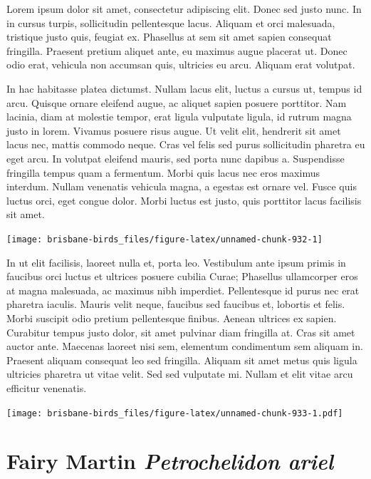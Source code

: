 \documentclass[]{book}
\let\origfigure\figure
\let\endorigfigure\endfigure
\renewenvironment{figure}[1][2] {
  \expandafter\origfigure\expandafter[H]
} {
  \endorigfigure
}
\begin{document}
Lorem ipsum dolor sit amet, consectetur adipiscing elit. Donec sed justo
nunc. In in cursus turpis, sollicitudin pellentesque lacus. Aliquam et
orci malesuada, tristique justo quis, feugiat ex. Phasellus at sem sit
amet sapien consequat fringilla. Praesent pretium aliquet ante, eu
maximus augue placerat ut. Donec odio erat, vehicula non accumsan quis,
ultricies eu arcu. Aliquam erat volutpat.

In hac habitasse platea dictumst. Nullam lacus elit, luctus a cursus ut,
tempus id arcu. Quisque ornare eleifend augue, ac aliquet sapien posuere
porttitor. Nam lacinia, diam at molestie tempor, erat ligula vulputate
ligula, id rutrum magna justo in lorem. Vivamus posuere risus augue. Ut
velit elit, hendrerit sit amet lacus nec, mattis commodo neque. Cras vel
felis sed purus sollicitudin pharetra eu eget arcu. In volutpat eleifend
mauris, sed porta nunc dapibus a. Suspendisse fringilla tempus quam a
fermentum. Morbi quis lacus nec eros maximus interdum. Nullam venenatis
vehicula magna, a egestas est ornare vel. Fusce quis luctus orci, eget
congue dolor. Morbi luctus est justo, quis porttitor lacus facilisis sit
amet.

\begin{figure}
\texttt{[image: brisbane-birds\_files/figure-latex/unnamed-chunk-932-1]} \caption{insert figure caption}\label{fig:unnamed-chunk-932}
\end{figure}

In ut elit facilisis, laoreet nulla et, porta leo. Vestibulum ante ipsum
primis in faucibus orci luctus et ultrices posuere cubilia Curae;
Phasellus ullamcorper eros at magna malesuada, ac maximus nibh
imperdiet. Pellentesque id purus nec erat pharetra iaculis. Mauris velit
neque, faucibus sed faucibus et, lobortis et felis. Morbi suscipit odio
pretium pellentesque finibus. Aenean ultrices ex sapien. Curabitur
tempus justo dolor, sit amet pulvinar diam fringilla at. Cras sit amet
auctor ante. Maecenas laoreet nisi sem, elementum condimentum sem
aliquam in. Praesent aliquam consequat leo sed fringilla. Aliquam sit
amet metus quis ligula ultricies pharetra ut vitae velit. Sed sed
vulputate mi. Nullam et elit vitae arcu efficitur venenatis.

\begin{figure}
\centering
\texttt{[image: brisbane-birds\_files/figure-latex/unnamed-chunk-933-1.pdf]}
\caption{\label{fig:unnamed-chunk-933}insert figure caption}
\end{figure}

\section{\texorpdfstring{Fairy Martin \emph{Petrochelidon
ariel}}{Fairy Martin Petrochelidon ariel}}\label{fairy-martin-petrochelidon-ariel}
\end{document}
